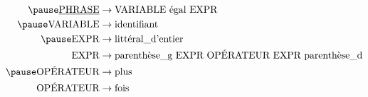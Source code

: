 \[
    \begin{aligned}
        \pause
        \underline{\text{PHRASE}} & \to \text{VARIABLE \'egal EXPR} \\
        \pause
        \text{VARIABLE}           & \to \text{identifiant} \\
        \pause
        \text{EXPR}               & \to \text{litt\'eral\_d’entier}  \\
        \text{EXPR}               & \to \text{parenth\`ese\_g EXPR OPÉRATEUR EXPR parenth\`ese\_d}  \\
        \pause
        \text{OPÉRATEUR}          & \to \text{plus} \\
        \text{OPÉRATEUR}          & \to \text{fois}
    \end{aligned}
\]
